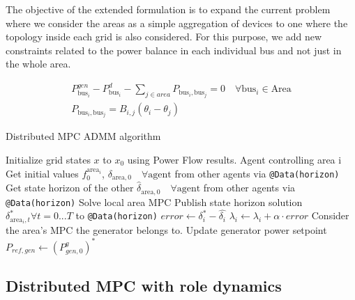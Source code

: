 \documentclass{article}
\begin{document}
The objective of the extended formulation is to expand the current problem where we consider the areas as a simple aggregation of devices to one where the topology inside each grid is also considered. For this purpose, we add new constraints related to the power balance in each individual bus and not just in the whole area.
 
\begin{align}
    P^{gen}_{\text{bus}_i} - P^d_{\text{bus}_i} - \sum_{j \in area} P_{\text{bus}_i, \text{bus}_j}= 0 \quad \forall \text{bus}_i \in \text{Area}\\
    P_{\text{bus}_i, \text{bus}_j} = B_{i,j}(\theta_{i}-\theta_{j})
\end{align}
\begin{algorithm}
    \caption{Distributed MPC ADMM algorithm}
    \label{algo:ADMM}
    \begin{algorithmic}[1]
        \State Initialize grid states $x$ to $x_0$ using Power Flow results.
                \State Agent controlling area i
                \State Get initial values $f_0^{\text{area}_i}$, $\delta_{\text{area}, 0} \quad \forall \text{agent}$ from other agents via \texttt{@Data(horizon)}
                \State Get state horizon of the other $\hat{\delta}_{\text{area}, 0} \quad \forall \text{agent}$ from other agents via \texttt{@Data(horizon)}
                \State Solve local area MPC
                \State Publish state horizon solution $\delta_{\text{area}_i, t}^* \forall t=0...T$ to \texttt{@Data(horizon)}
            \EndFor
            \State $error \gets \delta_{i}^* - \hat{\delta_{i}}$
            \State $\lambda_{i} \gets \lambda_{i} + \alpha \cdot error$
        \EndWhile
            \State Consider the area's MPC the generator belongs to.
            \State Update generator power setpoint $P_{ref, gen} \gets (P^{g}_{gen, 0})^*$
        \EndFor
    \end{algorithmic}
\end{algorithm}

\subsection{Distributed MPC with role dynamics}

\nocite{*}
\printbibliography
\end{document}
